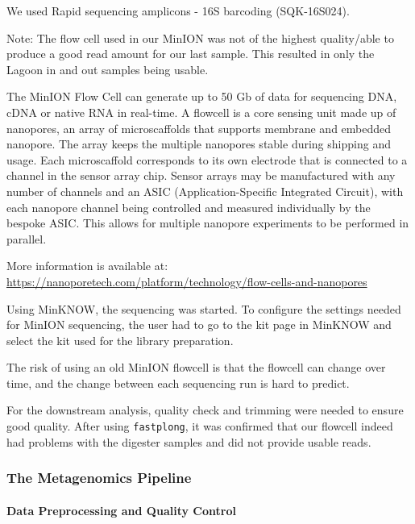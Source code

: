 \documentclass[
]{article}
\begin{document}
We used Rapid sequencing amplicons - 16S barcoding (SQK-16S024).

Note: The flow cell used in our MinION was not of the highest
quality/able to produce a good read amount for our last sample. This
resulted in only the Lagoon in and out samples being usable.

The MinION Flow Cell can generate up to 50 Gb of data for sequencing
DNA, cDNA or native RNA in real-time. A flowcell is a core sensing unit
made up of nanopores, an array of microscaffolds that supports membrane
and embedded nanopore. The array keeps the multiple nanopores stable
during shipping and usage. Each microscaffold corresponds to its own
electrode that is connected to a channel in the sensor array chip.
Sensor arrays may be manufactured with any number of channels and an
ASIC (Application-Specific Integrated Circuit), with each nanopore
channel being controlled and measured individually by the bespoke ASIC.
This allows for multiple nanopore experiments to be performed in
parallel.

More information is available at:
\url{https://nanoporetech.com/platform/technology/flow-cells-and-nanopores}

Using MinKNOW, the sequencing was started. To configure the settings
needed for MinION sequencing, the user had to go to the kit page in
MinKNOW and select the kit used for the library preparation.

The risk of using an old MinION flowcell is that the flowcell can change
over time, and the change between each sequencing run is hard to
predict.

For the downstream analysis, quality check and trimming were needed to
ensure good quality. After using \texttt{fastplong}, it was confirmed
that our flowcell indeed had problems with the digester samples and did
not provide usable reads.

\hypertarget{the-metagenomics-pipeline}{%
\subsubsection{The Metagenomics
Pipeline}\label{the-metagenomics-pipeline}}

\hypertarget{data-preprocessing-and-quality-control}{%
\paragraph{Data Preprocessing and Quality
Control}\label{data-preprocessing-and-quality-control}}
\end{document}

